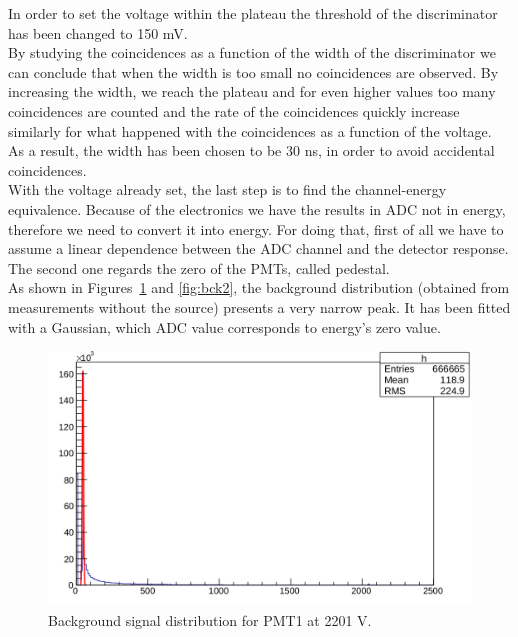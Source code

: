 \documentclass[10pt,swedish, openany]{book}
\begin{document}
In order to set the voltage within the plateau the threshold of the discriminator has been changed to 150 mV.\\

By studying the coincidences as a function of the width of the discriminator we can conclude that when the width is too small no coincidences are observed. By increasing the width, we reach the plateau and for even higher values too many coincidences are counted and the rate of the coincidences quickly increase similarly for what happened with the coincidences as a function of the voltage. As a result, the width has been chosen to be 30 ns, in order to avoid accidental coincidences.\\

With the voltage already set, the last step is to find the channel-energy equivalence. Because of the electronics we have the results in ADC not in energy, therefore we need to convert it into energy. For doing that, first of all we have to assume a linear dependence between the ADC channel and the detector response. The second one regards the zero of the PMTs, called pedestal.\\

As shown in Figures~\ref{fig:bck1} and \ref{fig:bck2}, the background distribution (obtained from measurements without the source) presents a very narrow peak. It has been fitted with a Gaussian, which ADC value corresponds to energy's zero value.

\begin{figure}[H]
\includegraphics[scale=0.3]{background1.png}
\centering
\caption{Background signal distribution for PMT1 at 2201 V.}
\label{fig:bck1}
\end{figure}
\end{document}
